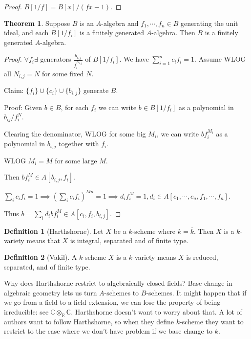 \documentclass{article}
\theoremstyle{definition}
\newtheorem*{definition}{Definition}
\newtheorem{theorem}{Theorem}
\begin{document}
    \begin{proof}
        \(B[1 / f] = B[x] / (fx - 1)\).
    \end{proof}

    \begin{theorem}
        Suppose \(B\) is an \(A\)-algebra and \(f_1, \cdots , f_n\in B\) generating the unit ideal, and each \(B[1 / f_i]\) is a finitely generated \(A\)-algebra. Then \(B\) is a finitely generated \(A\)-algebra.
    \end{theorem}

    \begin{proof}
        \(\forall f_i \exists\) generators \(\frac{b_{i,j}}{f_i^{N_{i,j}}}\) of \(B[1 / f_i]\). We have \(\sum_{i=1}^n c_i f_i = 1\). Assume WLOG all \(N_{i,j} = N\) for some fixed \(N\). 

        Claim: \(\{ f_i \} \cup \{ c_i \} \cup \{ b_{i,j} \} \) generate \(B\).

        Proof: Given \(b\in B\), for each \(f_i\) we can write \(b \in B[1 / f_i]\) as a polynomial in \(b_{ij} / f_i^N\).

        Clearing the denominator, WLOG for some big \(M_i\), we can write \(b f_i^{M_i}\) as a polynomial in \(b_{i,j}\) together with \(f_i\).
        
        WLOG \(M_i = M\) for some large \(M\).

        Then \(b f_i^M \in A[b_{i,j}, f_i]\).

        \(\sum_{i} c_i f_i = 1 \implies \left( \sum_{i} c_i f_i \right)^{Mn} = 1 \implies d_i f_i^M = 1, d_i \in A[c_1, \cdots , c_n, f_1, \cdots , f_n]\).

        Thus \(b = \sum_{i} d_i b f_i^M \in A[c_i, f_i, b_{i,j}]\).
    \end{proof}

    \begin{definition}
        [Harthshorne] Let \(X\) be a \(k\)-scheme where \(k = \overline{k}\). Then \(X\) is a \(k\)-variety means that \(X\) is integral, separated and of finite type.
    \end{definition}

    \begin{definition}
        [Vakil] A \(k\)-scheme \(X\) is a \(k\)-variety means \(X\) is reduced, separated, and of finite type.
    \end{definition}

    Why does Harthshorne restrict to algebraically closed fields? Base change in algebraic geometry lets us turn \(A\)-schemes to \(B\)-schemes. It might happen that if we go from a field to a field extension, we can lose the property of being irreducible: see \(\mathbb{C} \otimes_\mathbb{R} \mathbb{C}\). Harthshorne doesn't want to worry about that. A lot of authors want to follow Harthshorne, so when they define \(k\)-scheme they want to restrict to the case where we don't have problem if we base change to \(\overline{k}\).
\end{document}
